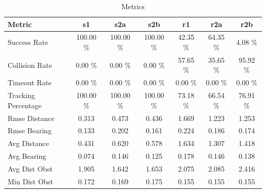 \begin{table}[h]
\centering
\caption{Metrics}
\label{tab:metrics}
\begin{tabular}{lcccccc}
\hline
\textbf{Metric} & \textbf{s1} & \textbf{s2a} & \textbf{s2b} & \textbf{r1} & \textbf{r2a} & \textbf{r2b}\\
\hline
Success Rate & 100.00 \% & 100.00 \% & 100.00 \% & 42.35 \% & 64.35 \% & 4.08 \%\\
Collision Rate & 0.00 \% & 0.00 \% & 0.00 \% & 57.65 \% & 35.65 \% & 95.92 \%\\
Timeout Rate & 0.00 \% & 0.00 \% & 0.00 \% & 0.00 \% & 0.00 \% & 0.00 \%\\
Tracking Percentage & 100.00 \% & 100.00 \% & 100.00 \% & 73.18 \% & 66.54 \% & 76.91 \%\\
Rmse Distance & 0.313 & 0.473 & 0.436 & 1.669 & 1.223 & 1.253\\
Rmse Bearing & 0.133 & 0.202 & 0.161 & 0.224 & 0.186 & 0.174\\
Avg Distance & 0.431 & 0.620 & 0.578 & 1.634 & 1.307 & 1.418\\
Avg Bearing & 0.074 & 0.146 & 0.125 & 0.178 & 0.146 & 0.138\\
Avg Dist Obst & 1.905 & 1.642 & 1.653 & 2.075 & 2.085 & 2.416\\
Min Dist Obst & 0.172 & 0.169 & 0.175 & 0.155 & 0.155 & 0.155\\
\hline
\end{tabular}
\end{table}
